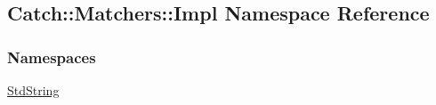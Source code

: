 \hypertarget{namespaceCatch_1_1Matchers_1_1Impl}{\subsection{Catch\-:\-:Matchers\-:\-:Impl Namespace Reference}
\label{namespaceCatch_1_1Matchers_1_1Impl}
}
\subsubsection*{Namespaces}
\begin{DoxyCompactItemize}
\item 
\hyperlink{namespaceCatch_1_1Matchers_1_1Impl_1_1StdString}{Std\-String}
\end{DoxyCompactItemize}
